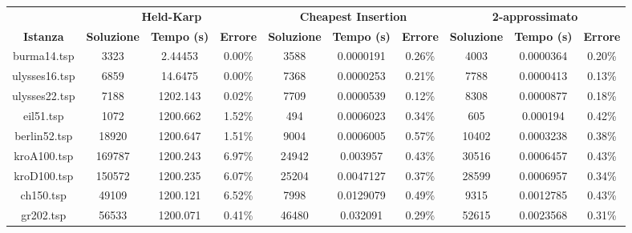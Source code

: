 \begin{longtable}{|c|c|c|c|c|c|c|c|c|c|}
\hline
\textbf{}        & \multicolumn{3}{c|}{\textbf{Held-Karp}}                   & \multicolumn{3}{c|}{\textbf{Cheapest Insertion}}          & \multicolumn{3}{c|}{\textbf{2-approssimato}}              \\ \cline{2-10} 
\textbf{Istanza} & \textbf{Soluzione} & \textbf{Tempo (s)} & \textbf{Errore} & \textbf{Soluzione} & \textbf{Tempo (s)} & \textbf{Errore} & \textbf{Soluzione} & \textbf{Tempo (s)} & \textbf{Errore} \\ \hline
burma14.tsp      & 3323               & 2.44453            & 0.00\%          & 3588               & 0.0000191          & 0.26\%          & 4003               & 0.0000364          & 0.20\%          \\ \hline
ulysses16.tsp    & 6859               & 14.6475            & 0.00\%          & 7368               & 0.0000253          & 0.21\%          & 7788               & 0.0000413          & 0.13\%          \\ \hline
ulysses22.tsp    & 7188               & 1202.143           & 0.02\%          & 7709               & 0.0000539          & 0.12\%          & 8308               & 0.0000877          & 0.18\%          \\ \hline
eil51.tsp        & 1072               & 1200.662           & 1.52\%          & 494                & 0.0006023          & 0.34\%          & 605                & 0.000194           & 0.42\%          \\ \hline
berlin52.tsp     & 18920              & 1200.647           & 1.51\%          & 9004              & 0.0006005          & 0.57\%          & 10402              & 0.0003238          & 0.38\%          \\ \hline
kroA100.tsp      & 169787             & 1200.243           & 6.97\%          & 24942              & 0.003957           & 0.43\%          & 30516              & 0.0006457          & 0.43\%          \\ \hline
kroD100.tsp      & 150572             & 1200.235           & 6.07\%          & 25204              & 0.0047127          & 0.37\%          & 28599              & 0.0006957          & 0.34\%          \\ \hline
ch150.tsp        & 49109              & 1200.121           & 6.52\%          & 7998               & 0.0129079          & 0.49\%          & 9315               & 0.0012785          & 0.43\%          \\ \hline
gr202.tsp        & 56533              & 1200.071           & 0.41\%          & 46480              & 0.032091           & 0.29\%          & 52615              & 0.0023568          & 0.31\%          \\ \hline

\end{longtable}

